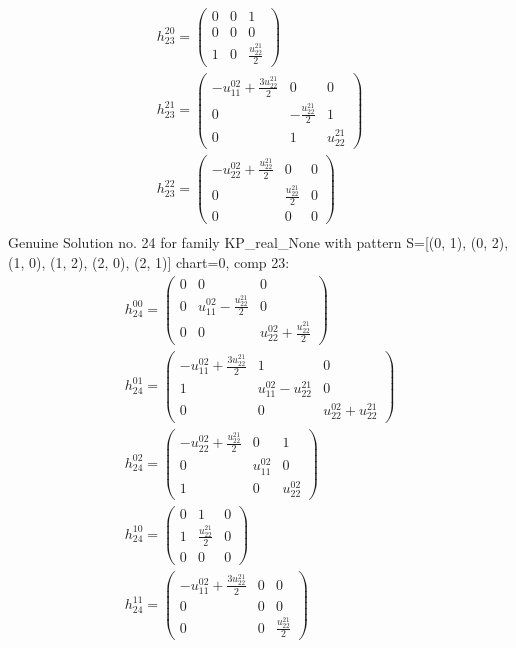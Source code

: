 \documentclass[a4paper, 11pt, twoside, onecolumn]{article}
\begin{document}
\begin{landscape}
\begin{gather*}
	 h_{23}^{20}=\begin{pmatrix}0 & 0 & 1\\0 & 0 & 0\\1 & 0 & \frac{u^{21}_{22}}{2}\end{pmatrix}\\ 
	 h_{23}^{21}=\begin{pmatrix}- u^{02}_{11} + \frac{3 u^{21}_{22}}{2} & 0 & 0\\0 & - \frac{u^{21}_{22}}{2} & 1\\0 & 1 & u^{21}_{22}\end{pmatrix}\\ 
	 h_{23}^{22}=\begin{pmatrix}- u^{02}_{22} + \frac{u^{21}_{22}}{2} & 0 & 0\\0 & \frac{u^{21}_{22}}{2} & 0\\0 & 0 & 0\end{pmatrix}\\ 
\end{gather*} 
Genuine Solution no. 24 for family KP_real_None with pattern S=[(0, 1), (0, 2), (1, 0), (1, 2), (2, 0), (2, 1)] chart=0, comp 23: 
\begin{gather*} 
	 h_{24}^{00}=\begin{pmatrix}0 & 0 & 0\\0 & u^{02}_{11} - \frac{u^{21}_{22}}{2} & 0\\0 & 0 & u^{02}_{22} + \frac{u^{21}_{22}}{2}\end{pmatrix}\\ 
	 h_{24}^{01}=\begin{pmatrix}- u^{02}_{11} + \frac{3 u^{21}_{22}}{2} & 1 & 0\\1 & u^{02}_{11} - u^{21}_{22} & 0\\0 & 0 & u^{02}_{22} + u^{21}_{22}\end{pmatrix}\\ 
	 h_{24}^{02}=\begin{pmatrix}- u^{02}_{22} + \frac{u^{21}_{22}}{2} & 0 & 1\\0 & u^{02}_{11} & 0\\1 & 0 & u^{02}_{22}\end{pmatrix}\\ 
	 h_{24}^{10}=\begin{pmatrix}0 & 1 & 0\\1 & \frac{u^{21}_{22}}{2} & 0\\0 & 0 & 0\end{pmatrix}\\ 
	 h_{24}^{11}=\begin{pmatrix}- u^{02}_{11} + \frac{3 u^{21}_{22}}{2} & 0 & 0\\0 & 0 & 0\\0 & 0 & \frac{u^{21}_{22}}{2}\end{pmatrix}\\ 

\end{gather*}
\end{landscape}
\end{document}
